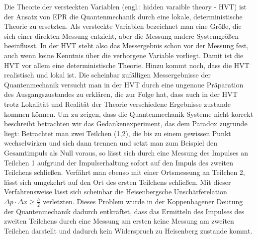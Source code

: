 \documentclass[twoside,colorback,accentcolor=tud4c,11pt]{tudreport}
\begin{document}
Die Theorie der versteckten Variablen (engl.: hidden varaible theory - HVT) ist der Ansatz von EPR die Quantenmechanik durch eine lokale, deterministische Theorie zu ersetzten. Als versteckte Variablen bezeichnet man eine Größe, die sich einer direkten Messung entzieht, aber die Messung andere Systemgrößen beeinflusst. In der HVT steht also das Messergebnis schon vor der Messung fest, auch wenn keine Kenntnis über die verborgene Variable vorliegt. Damit ist die HVT vor allem eine deterministische Theorie. Hinzu kommt noch, dass die HVT realistisch und lokal ist. Die scheinbar zufälligen Messergebnisse der Quantenmechanik versucht man in der HVT durch eine ungenaue Präparation des Ausgangszustandes zu erklären, die zur Folge hat, dass auch in der HVT trotz Lokalität und Realität der Theorie verschiedene Ergebnisse zustande kommen können.
Um zu zeigen, dass die Quantenmechanik Systeme nicht korrekt beschreibt betrachten wir das Gedankenexperiment, das dem Paradox zugrunde liegt:
Betrachtet man zwei Teilchen (1,2), die bis zu einem gewissen Punkt wechselwirken und sich dann trennen und setzt man zum Beispiel den Gesamtimpuls als Null voraus, so lässt sich durch eine Messung des Impulses an Teilchen 1 aufgrund der Impulserhaltung sofort auf den Impuls des zweiten Teilchens schließen. Verfährt man ebenso mit einer Ortsmessung an Teilchen 2, lässt sich umgekehrt auf den Ort des ersten Teilchens schließen. Mit dieser Verfahrensweise lässt sich scheinbar die Heisenbergsche Unschärferelation $\Delta p\cdot\Delta x\geq\frac{\hbar}{2}$ verletzten. Dieses Problem wurde in der Koppenhagener Deutung der Quantenmechanik dadurch entkräftet, dass das Ermitteln des Impulses des zweiten Teilchens durch eine Messung am ersten keine Messung am zweiten Teilchen darstellt und dadurch kein Widerspruch zu Heisenberg zustande kommt.
\end{document}
